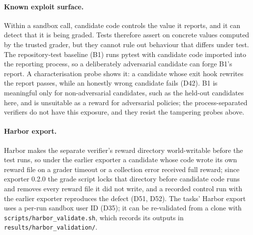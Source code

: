 \paragraph{Known exploit surface.} Within a sandbox call, candidate code controls the value it reports, and it can detect
that it is being graded. Tests therefore assert on concrete values computed by the trusted grader, but they cannot rule
out behaviour that differs under test. The repository-test baseline (B1) runs pytest with candidate code imported into
the reporting process, so a deliberately adversarial candidate can forge B1's report. A characterisation probe shows it:
a candidate whose exit hook rewrites the report passes, while an honestly wrong candidate fails (D42). B1 is meaningful
only for non-adversarial candidates, such as the held-out candidates here, and is unsuitable as a reward for
adversarial policies; the process-separated verifiers do not have this exposure, and they resist the tampering probes
above.

\paragraph{Harbor export.} Harbor makes the separate verifier's reward directory world-writable before the test
runs, so under the earlier exporter a candidate whose code wrote its own reward file on a grader timeout or a collection
error received full reward; since exporter 0.2.0 the grade script locks that directory before candidate code runs and
removes every reward file it did not write, and a recorded control run with the earlier exporter reproduces the defect
(D51, D52). The tasks' Harbor export uses a per-run sandbox user ID (D35); it can be re-validated from a
clone with \texttt{scripts/harbor\_validate.sh}, which records its outputs in \texttt{results/harbor\_validation/}.

